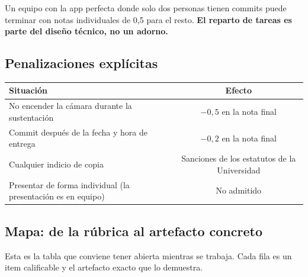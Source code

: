 \documentclass[11pt,letterpaper]{article}
\begin{document}
\noindent Un equipo con la app perfecta donde solo dos personas tienen commits
puede terminar con notas individuales de 0,5 para el resto. \textbf{El reparto de
tareas es parte del dise\~no t\'ecnico, no un adorno.}

\subsection{Penalizaciones expl\'icitas}

\begin{center}
\begin{tabularx}{\linewidth}{@{}X c@{}}
\toprule
\textbf{Situaci\'on} & \textbf{Efecto}\\
\midrule
No encender la c\'amara durante la sustentaci\'on & $-0{,}5$ en la nota final\\
Commit despu\'es de la fecha y hora de entrega & $-0{,}2$ en la nota final\\
Cualquier indicio de copia & Sanciones de los estatutos de la Universidad\\
Presentar de forma individual (la presentaci\'on es en equipo) & No admitido\\
\bottomrule
\end{tabularx}
\end{center}

\subsection{Mapa: de la r\'ubrica al artefacto concreto}

Esta es la tabla que conviene tener abierta mientras se trabaja. Cada fila es un
item calificable y el artefacto exacto que lo demuestra.
\end{document}
